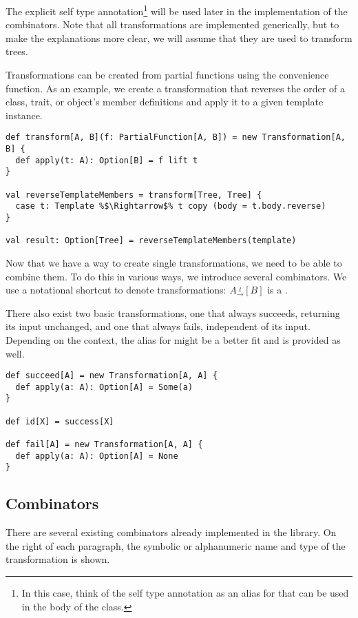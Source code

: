 \documentclass[10pt,a4paper,oneside]{scrreprt}
\begin{document}
The explicit self type annotation\footnote{In this case, think of the self type annotation as an alias for  that can be used in the body of the class.} will be used later in the implementation of the combinators. Note that all transformations are implemented generically, but to make the explanations more clear, we will assume that they are used to transform trees.

Transformations can be created from partial functions using the  convenience function. As an example, we create a transformation that reverses the order of a class, trait, or object's member definitions and apply it to a given template instance.

\begin{lstlisting}
def transform[A, B](f: PartialFunction[A, B]) = new Transformation[A, B] {
  def apply(t: A): Option[B] = f lift t
}

val reverseTemplateMembers = transform[Tree, Tree] {
  case t: Template %$\Rightarrow$% t copy (body = t.body.reverse)
}

val result: Option[Tree] = reverseTemplateMembers(template)
\end{lstlisting}

Now that we have a way to create single transformations, we need to be able to combine them. To do this in various ways, we introduce several combinators. We use a notational shortcut to denote transformations: $A \overset{t}{_\rightarrow} [B]$ is a .

There also exist two basic transformations, one that always succeeds, returning its input unchanged, and one that always fails, independent of its input. Depending on the context, the alias  for  might be a better fit and is provided as well.

\begin{lstlisting}
def succeed[A] = new Transformation[A, A] {
  def apply(a: A): Option[A] = Some(a)
}

def id[X] = success[X]

def fail[A] = new Transformation[A, A] {
  def apply(a: A): Option[A] = None
}
\end{lstlisting}

\subsection{Combinators}

There are several existing combinators already implemented in the library. On the right of each paragraph, the symbolic or alphanumeric name and type of the transformation is shown.
\end{document}

